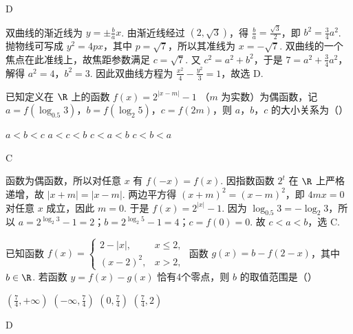 \begin{answer}
D
\end{answer}

\begin{solution}
双曲线的渐近线为 \(y=\pm\frac{b}{a}x\). 由渐近线经过 \((2,\sqrt3)\)，得 \(\frac{b}{a}=\frac{\sqrt3}{2}\)，即 \(b^2=\frac34a^2\). 抛物线可写成 \(y^2=4px\)，其中 \(p=\sqrt7\)，所以其准线为 \(x=-\sqrt7\). 双曲线的一个焦点在此准线上，故焦距参数满足 \(c=\sqrt7\). 又 \(c^2=a^2+b^2\)，于是 \(7=a^2+\frac34a^2\)，解得 \(a^2=4\)，\(b^2=3\). 因此双曲线方程为 \(\frac{x^2}{4}-\frac{y^2}{3}=1\)，故选 D.
\end{solution}

\begin{problem}
已知定义在 \(\R\) 上的函数 \(f(x) = 2^{|x - m|} - 1\) （\(m\) 为实数）为偶函数，记 \(a = f(\log_{0.5} 3)\)，\(b = f(\log_{2} 5)\)，\(c = f(2m)\)，则 \(a\)，\(b\)，\(c\) 的大小关系为（\quad）

\choices
    {\(a < b < c\)}
    {\(a < c < b\)}
    {\(c < a < b\)}
    {\(c < b < a\)}
\end{problem}

\begin{answer}
C
\end{answer}

\begin{solution}
函数为偶函数，所以对任意 \(x\) 有 \(f(-x)=f(x)\). 因指数函数 \(2^t\) 在 \(\R\) 上严格递增，故 \(|x+m|=|x-m|\). 两边平方得 \((x+m)^2=(x-m)^2\)，即 \(4mx=0\) 对任意 \(x\) 成立，因此 \(m=0\). 于是 \(f(x)=2^{|x|}-1\). 因为 \(\log_{0.5}3=-\log_2 3\)，所以 \(a=2^{\log_2 3}-1=2\)；\(b=2^{\log_2 5}-1=4\)；\(c=f(0)=0\). 故 \(c<a<b\)，选 C.
\end{solution}

\begin{problem}
已知函数 \( f(x) = \begin{cases}
2 - |x|, & x \leqslant 2,\\
(x - 2)^2, & x > 2,
\end{cases} \) 函数 \( g(x) = b - f(2 - x)\)，其中 \( b \in \R\). 若函数 \( y = f(x) - g(x) \) 恰有4个零点，则 \( b \) 的取值范围是（\quad）

\choices
    {\(\left(\frac{7}{4}, +\infty\right)\)}
    {\(\left(-\infty, \frac{7}{4}\right)\)}
    {\(\left(0, \frac{7}{4}\right)\)}
    {\(\left(\frac{7}{4}, 2\right)\)}
\end{problem}

\begin{answer}
D
\end{answer}

